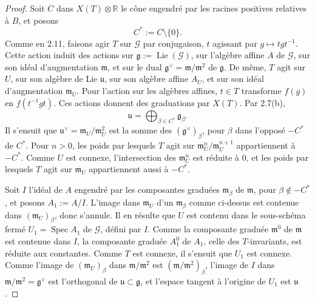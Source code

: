 \documentclass[11pt]{article}
\newcommand{\Lie}{\operatorname{Lie}}
\begin{document}
\begin{proof}
Soit \(C\) dans \(X(T)\otimes\mathbb R\) le cône engendré par les racines positives
relatives à \(B\), et posons
\begin{equation}
  C^*:=C\setminus\{0\}.\tag{2.12.1}
\end{equation}
Comme en 2.11, faisons agir \(T\) sur \(\mathcal G\) par conjugaison, \(t\) agissant
par \(g\mapsto tgt^{-1}\). Cette action induit des actions sur
\(\mathfrak g:=\Lie(\mathcal G)\), sur l'algèbre affine \(A\) de \(\mathcal G\), sur
son idéal d'augmentation \(\mathfrak m\), et sur le dual
\(\mathfrak g^\vee=\mathfrak m/\mathfrak m^2\) de \(\mathfrak g\). De même, \(T\) agit
sur \(U\), sur son algèbre de Lie \(\mathfrak u\), sur son algèbre affine \(A_U\), et
sur son idéal d'augmentation \(\mathfrak m_U\). Pour l'action sur les algèbres affines,
\(t\in T\) transforme \(f(g)\) en \(f(t^{-1}gt)\). Ces actions donnent des graduations
par \(X(T)\). Par 2.7(b),
\begin{equation}
  \mathfrak u=\bigoplus_{\beta\in C^*}\mathfrak g_\beta .
  \tag{2.12.2}
\end{equation}
Il s'ensuit que \(\mathfrak u^\vee=\mathfrak m_U/\mathfrak m_U^2\) est la somme des
\((\mathfrak g^\vee)_\beta\), pour \(\beta\) dans l'opposé \(-C^*\) de \(C^*\). Pour
\(n>0\), les poids par lesquels \(T\) agit sur
\(\mathfrak m_U^n/\mathfrak m_U^{n+1}\) appartiennent à \(-C^*\). Comme \(U\) est
connexe, l'intersection des \(\mathfrak m_U^n\) est réduite à \(0\), et les poids par
lesquels \(T\) agit sur \(\mathfrak m_U\) appartiennent aussi à \(-C^*\).

Soit \(I\) l'idéal de \(A\) engendré par les composantes graduées \(\mathfrak m_\beta\)
de \(\mathfrak m\), pour \(\beta\notin -C^*\), et posons \(A_1:=A/I\). L'image dans
\(\mathfrak m_U\) d'un \(\mathfrak m_\beta\) comme ci-dessus est contenue dans
\((\mathfrak m_U)_\beta\), donc s'annule. Il en résulte que \(U\) est contenu dans le
sous-schéma fermé \(U_1=\operatorname{Spec}A_1\) de \(\mathcal G\), défini par \(I\).
Comme la composante graduée \(\mathfrak m^0\) de \(\mathfrak m\) est contenue dans
\(I\), la composante graduée \(A_1^0\) de \(A_1\), celle des \(T\)-invariants, est
réduite aux constantes. Comme \(T\) est connexe, il s'ensuit que \(U_1\) est connexe.
Comme l'image de \((\mathfrak m_U)_\beta\) dans \(\mathfrak m/\mathfrak m^2\) est
\((\mathfrak m/\mathfrak m^2)_\beta\), l'image de \(I\) dans
\(\mathfrak m/\mathfrak m^2=\mathfrak g^\vee\) est l'orthogonal de
\(\mathfrak u\subset\mathfrak g\), et l'espace tangent à l'origine de \(U_1\) est
\(\mathfrak u\).


\end{proof}
\end{document}
